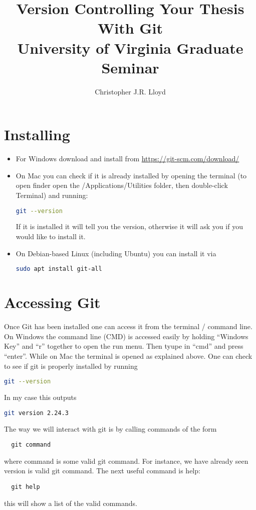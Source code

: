 \documentclass{article}
\title{Version Controlling Your Thesis With Git\\ {\large University of
  Virginia Graduate Seminar}}
\author{Christopher J.R. Lloyd}
\begin{document}
\maketitle
\section{Installing}
\begin{itemize}
\item For Windows download and install from \href{https://git-scm.com/download/}{https://git-scm.com/download/}
\item On Mac you can check if it is already installed by opening the
  terminal (to open finder open the /Applications/Utilities folder,
  then double-click Terminal) and running:
\begin{lstlisting}[language=bash]
  git --version
\end{lstlisting}
If it is installed it will tell you the version, otherwise it will ask
you if you would like to install it.
\item On Debian-based Linux (including Ubuntu) you can install it via
\begin{lstlisting}[language=bash]
  sudo apt install git-all
\end{lstlisting}
\end{itemize}
\section{Accessing Git}
Once Git has been installed one can access it from the terminal /
command line. On Windows the command line (CMD) is accessed easily by
holding ``Windows Key'' and ``r'' together to open the run menu. Then
tyupe in ``cmd'' and press ``enter''. While on Mac the terminal is
opened as explained above. One can check to see if git is properly
installed by running
\begin{lstlisting}[language=bash]
  git --version
\end{lstlisting}
In my case this outputs 
\begin{lstlisting}[language=bash]
  git version 2.24.3
\end{lstlisting}
The way we will interact with git is by calling commands of the form
\begin{lstlisting}
  git command
\end{lstlisting}
where command is some valid git command. For instance, we have already
seen version is valid git command. The next useful command is help:
\begin{lstlisting}
  git help
\end{lstlisting}
this will show a list of the valid commands.
\end{document}
